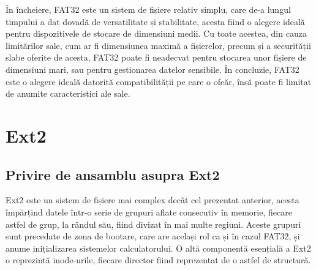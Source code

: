 În încheiere, FAT32 este un sistem de fișiere relativ simplu, care de-a lungul timpului a dat dovadă de versatilitate și stabilitate, acesta fiind o alegere ideală pentru dispozitivele de stocare de dimensiuni medii. Cu toate acestea, din cauza limitărilor sale, cum ar fi dimensiunea maximă a fișierelor, precum și a securității slabe oferite de acesta, FAT32 poate fi neadecvat pentru stocarea unor fișiere de dimensiuni mari, sau pentru gestionarea datelor sensibile. În concluzie, FAT32 este o alegere ideală datorită compatibilității pe care o ofeăr, însă poate fi limitat de anumite caracteristici ale sale.




















\newpage

\section{Ext2}

\subsection{Privire de ansamblu asupra Ext2}

Ext2 este un sistem de fișiere mai complex decât cel prezentat anterior, acesta împărțind datele într-o serie de grupuri aflate consecutiv în memorie, fiecare astfel de grup, la rândul său, fiind divizat în mai multe regiuni. Aceste grupuri sunt precedate de zona de bootare, care are același rol ca și în cazul FAT32, și anume inițializarea sistemelor calculatorului. O altă componentă esențială a Ext2 o reprezintă inode-urile, fiecare director fiind reprezentat de o astfel de structură.

